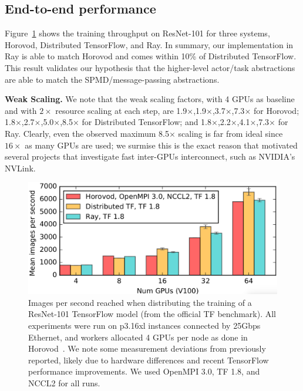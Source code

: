 \subsection{End-to-end performance}
Figure~\ref{fig:sgd} shows the training throughput on ResNet-101 for three systems, Horovod, Distributed TensorFlow, and Ray.  In summary, our implementation in Ray is able to match Horovod and comes within 10\% of Distributed TensorFlow.  This result validates our hypothesis that the higher-level actor/task abstractions are able to match the SPMD/message-passing abstractions.

{\bf Weak Scaling.}  We note that the weak scaling factors, with 4 GPUs as baseline and with $2\times$ resource scaling at each step, are 1.9$\times$,1.9$\times$,3.7$\times$,7.3$\times$ for Horovod;
1.8$\times$,2.7$\times$,5.0$\times$,8.5$\times$ for Distributed TensorFlow;
and
1.8$\times$,2.2$\times$,4.1$\times$,7.3$\times$ for Ray.  Clearly, even the observed maximum 8.5$\times$ scaling  is far from ideal since $16\times$ as many GPUs are used; we surmise this is the exact reason that motivated several projects that investigate fast inter-GPUs interconnect, such as  NVIDIA's NVLink.

\begin{figure}[tb]
    \centering
    \includegraphics[width=5.1in,keepaspectratio]{fig/sgd.png}
    \caption{
    \small{
        Images per second reached when distributing the training of a
        ResNet-101 TensorFlow model (from the official TF benchmark).
        All experiments were run on p3.16xl instances connected by 25Gbps Ethernet, and
        workers allocated 4 GPUs per node as done in Horovod~\cite{horovod}.
        We note some measurement deviations from previously reported, likely
        due to hardware differences and
        recent TensorFlow performance improvements. We used
        OpenMPI 3.0, TF 1.8, and NCCL2 for all runs.
    }
    }
    \label{fig:sgd}
\end{figure}

